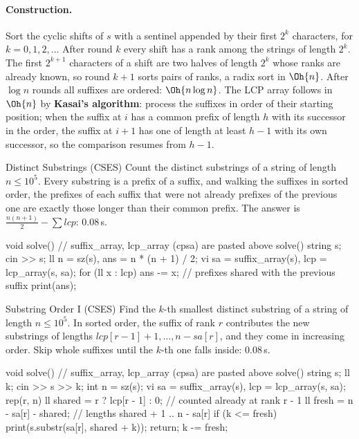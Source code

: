 \paragraph{Construction.} Sort the cyclic shifts of $s$ with a sentinel appended by their first $2^k$ characters, for $k = 0, 1, 2,
\dots$ After round $k$ every shift has a rank among the strings of length $2^k$. The first $2^{k+1}$ characters of a shift are two
halves of length $2^k$ whose ranks are already known, so round $k + 1$ sorts pairs of ranks, a radix sort in $\Oh{n}$. After $\log n$
rounds all suffixes are ordered: $\Oh{n \log n}$. The LCP array follows in $\Oh{n}$ by \textbf{Kasai's algorithm}: process the suffixes
in order of their starting position; when the suffix at $i$ has a common prefix of length $h$ with its successor in the order, the suffix
at $i + 1$ has one of length at least $h - 1$ with its own successor, so the comparison resumes from $h - 1$.


\begin{problem}{Distinct Substrings (CSES)}
Count the distinct substrings of a string of length $n \le 10^5$.
\solution Every substring is a prefix of a suffix, and walking the suffixes in sorted order, the prefixes of each suffix that were not
already prefixes of the previous one are exactly those longer than their common prefix. The answer is $\frac{n(n+1)}{2} - \sum
\mathit{lcp}$: 0.08\,s.
\end{problem}

\begin{code}
void solve() {  // suffix_array, lcp_array (cpsa) are pasted above solve()
    string s;
    cin >> s;
    ll n = sz(s), ans = n * (n + 1) / 2;
    vi sa = suffix_array(s), lcp = lcp_array(s, sa);
    for (ll x : lcp) ans -= x;  // prefixes shared with the previous suffix
    print(ans);
}
\end{code}

\begin{problem}{Substring Order I (CSES)}
Find the $k$-th smallest distinct substring of a string of length $n \le 10^5$.
\solution In sorted order, the suffix of rank $r$ contributes the new substrings of lengths $\mathit{lcp}[r-1] + 1, \dots, n - \mathit{sa}[r]$,
and they come in increasing order. Skip whole suffixes until the $k$-th one falls inside: 0.08\,s.
\end{problem}

\begin{code}
void solve() {  // suffix_array, lcp_array (cpsa) are pasted above solve()
    string s;
    ll k;
    cin >> s >> k;
    int n = sz(s);
    vi sa = suffix_array(s), lcp = lcp_array(s, sa);
    rep(r, n) {
        ll shared = r ? lcp[r - 1] : 0;  // counted already at rank r - 1
        ll fresh = n - sa[r] - shared;  // lengths shared + 1 .. n - sa[r]
        if (k <= fresh) {
            print(s.substr(sa[r], shared + k));
            return;
        }
        k -= fresh;
    }
}
\end{code}

